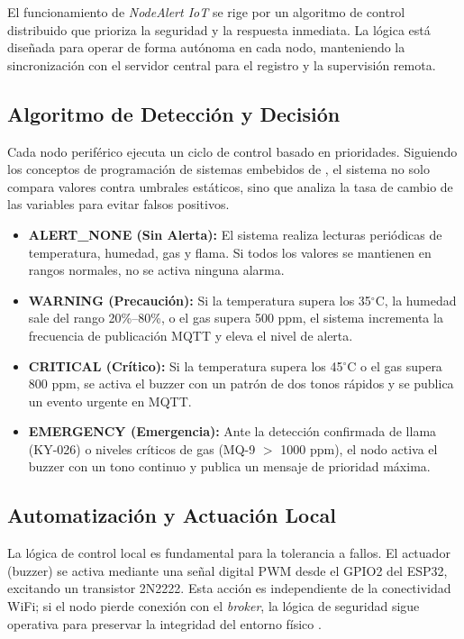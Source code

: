 

El funcionamiento de \textit{NodeAlert IoT} se rige por un algoritmo de control distribuido que prioriza la seguridad y la respuesta inmediata. La lógica está diseñada para operar de forma autónoma en cada nodo, manteniendo la sincronización con el servidor central para el registro y la supervisión remota.

\subsection{Algoritmo de Detección y Decisión}
Cada nodo periférico ejecuta un ciclo de control basado en prioridades. Siguiendo los conceptos de programación de sistemas embebidos de \citet{valvano2014volume1}, el sistema no solo compara valores contra umbrales estáticos, sino que analiza la tasa de cambio de las variables para evitar falsos positivos.

\begin{itemize}
    \item \textbf{ALERT\_NONE (Sin Alerta):} El sistema realiza lecturas peri\'odicas de temperatura, humedad, gas y flama. Si todos los valores se mantienen en rangos normales, no se activa ninguna alarma.
    \item \textbf{WARNING (Precauci\'on):} Si la temperatura supera los 35$^{\circ}$C, la humedad sale del rango 20\%--80\%, o el gas supera 500 ppm, el sistema incrementa la frecuencia de publicaci\'on MQTT y eleva el nivel de alerta.
    \item \textbf{CRITICAL (Cr\'itico):} Si la temperatura supera los 45$^{\circ}$C o el gas supera 800 ppm, se activa el buzzer con un patr\'on de dos tonos r\'apidos y se publica un evento urgente en MQTT.
    \item \textbf{EMERGENCY (Emergencia):} Ante la detecci\'on confirmada de llama (KY-026) o niveles cr\'iticos de gas (MQ-9 $>$ 1000 ppm), el nodo activa el buzzer con un tono continuo y publica un mensaje de prioridad m\'axima.
\end{itemize}

\subsection{Automatizaci\'on y Actuaci\'on Local}
La l\'ogica de control local es fundamental para la tolerancia a fallos. El actuador (buzzer) se activa mediante una se\~nal digital PWM desde el GPIO2 del ESP32, excitando un transistor 2N2222. Esta acci\'on es independiente de la conectividad WiFi; si el nodo pierde conexi\'on con el \textit{broker}, la l\'ogica de seguridad sigue operativa para preservar la integridad del entorno f\'isico \citep{valvano2014volume2}.

